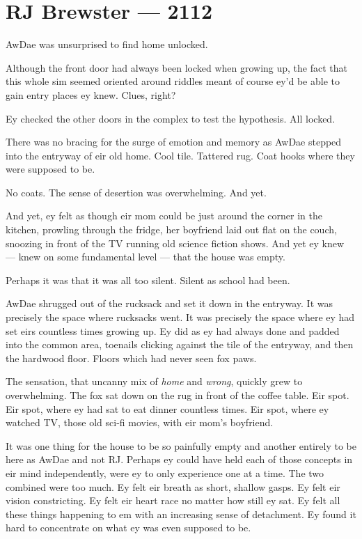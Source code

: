 \hypertarget{rj-brewster-2112}{%
\chapter*{RJ Brewster — 2112}\label{rj-brewster-2112}}

AwDae was unsurprised to find home unlocked.

Although the front door had always been locked when growing up, the fact that this whole sim seemed oriented around riddles meant of course ey'd be able to gain entry places ey knew. Clues, right?

Ey checked the other doors in the complex to test the hypothesis. All locked.

There was no bracing for the surge of emotion and memory as AwDae stepped into the entryway of eir old home. Cool tile. Tattered rug. Coat hooks where they were supposed to be.

No coats. The sense of desertion was overwhelming. And yet.

And yet, ey felt as though eir mom could be just around the corner in the kitchen, prowling through the fridge, her boyfriend laid out flat on the couch, snoozing in front of the TV running old science fiction shows. And yet ey knew — knew on some fundamental level — that the house was empty.

Perhaps it was that it was all too silent. Silent as school had been.

AwDae shrugged out of the rucksack and set it down in the entryway. It was precisely the space where rucksacks went. It was precisely the space where ey had set eirs countless times growing up. Ey did as ey had always done and padded into the common area, toenails clicking against the tile of the entryway, and then the hardwood floor. Floors which had never seen fox paws.

The sensation, that uncanny mix of \emph{home} and \emph{wrong}, quickly grew to overwhelming. The fox sat down on the rug in front of the coffee table. Eir spot. Eir spot, where ey had sat to eat dinner countless times. Eir spot, where ey watched TV, those old sci-fi movies, with eir mom's boyfriend.

It was one thing for the house to be so painfully empty and another entirely to be here as AwDae and not RJ. Perhaps ey could have held each of those concepts in eir mind independently, were ey to only experience one at a time. The two combined were too much. Ey felt eir breath as short, shallow gasps. Ey felt eir vision constricting. Ey felt eir heart race no matter how still ey sat. Ey felt all these things happening to em with an increasing sense of detachment. Ey found it hard to concentrate on what ey was even supposed to be.

